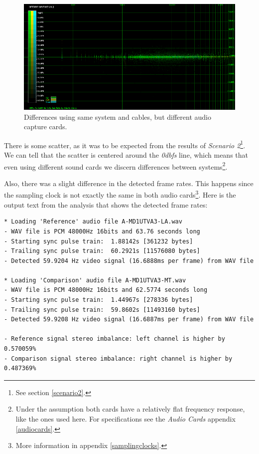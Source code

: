 \documentclass[10pt,a4paper]{report}
\newcommand{\db}[1]{\textit{#1\acrshort{dbfs}}}
\begin{document}
\begin{figure}[H]
	\centering
	\includegraphics[width=1.0\linewidth]{images/interpretation/Plot5-1-All.png}
	\caption[Different sound cards]{Differences using same system and cables, but different audio capture cards.}
	\label{fig:plot5-1-all}
\end{figure}

There is some scatter, as it was to be expected from the results of \textit{Scenario 2}\footnote{See section \ref{scenario2}.}. We can tell that the scatter is centered around the \db{0} line, which means that even using different sound cards we discern differences between systems\footnote{Under the assumption both cards have a relatively flat frequency response, like the ones used here. For specifications see the \textit{Audio Cards} appendix \ref{audiocards}.}. 

Also, there was a slight difference in the detected frame rates. This happens since the sampling clock is not exactly the same in both audio cards\footnote{More information in appendix \ref{samplingclocks}.}. Here is the output text from the analysis that shows the detected frame rates:

\begin{verbatim}
* Loading 'Reference' audio file A-MD1UTVA3-LA.wav
- WAV file is PCM 48000Hz 16bits and 63.76 seconds long
- Starting sync pulse train:  1.88142s [361232 bytes]
- Trailing sync pulse train:  60.2921s [11576080 bytes]
- Detected 59.9204 Hz video signal (16.6888ms per frame) from WAV file

* Loading 'Comparison' audio file A-MD1UTVA3-MT.wav
- WAV file is PCM 48000Hz 16bits and 62.5774 seconds long
- Starting sync pulse train:  1.44967s [278336 bytes]
- Trailing sync pulse train:  59.8602s [11493160 bytes]
- Detected 59.9208 Hz video signal (16.6887ms per frame) from WAV file

- Reference signal stereo imbalance: left channel is higher by 0.570059%
- Comparison signal stereo imbalance: right channel is higher by 0.487369%
\end{verbatim}
\end{document}
